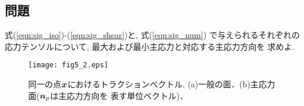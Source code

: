 \documentclass[10pt,a4j]{jarticle}
\begin{document}
\subsection{問題}
式(\ref{eqn:sig_iso})-(\ref{eqn:sig_shear})と, 式(\ref{eqn:sig_num})
で与えられるそれぞれの応力テンソルについて, 最大および最小主応力と対応する主応力方向を
求めよ. 
\begin{figure}[h]
	\begin{center}
	\texttt{[image: fig5\_2.eps]} 
	\end{center}
	\caption{
	同一の点$\mbox{\boldmath $x$}$におけるトラクションベクトル.
	(a)一般の面．(b)主応力面($\mbox{\boldmath $n$}_p$は主応力方向を
	表す単位ベクトル)．
	 } 
	\label{fig:fig5_2}
\end{figure}
\end{document}
